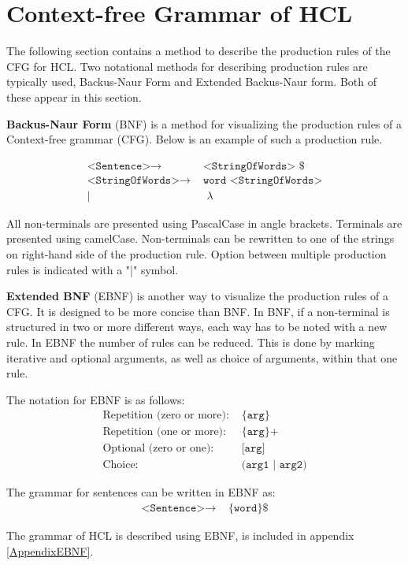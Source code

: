 \section{Context-free Grammar of HCL}
\label{CFGdescription}
The following section contains a method to describe the production rules of the CFG for HCL.
Two notational methods for describing production rules are typically used, Backus-Naur Form and Extended Backus-Naur form. 
Both of these appear in this section.

\textbf{Backus-Naur Form} (BNF) is a method for visualizing the production rules of a Context-free grammar (CFG).
Below is an example of such a production rule.

\begin{align*}
	\texttt{<Sentence>}\to & \texttt{ <StringOfWords> \$}\\
	\texttt{<StringOfWords>}\to & \texttt{ word <StringOfWords>}\\
	| & \texttt{ }\lambda
\end{align*}

All non-terminals are presented using PascalCase in angle brackets.
Terminals are presented using camelCase.
Non-terminals can be rewritten to one of the strings on right-hand side of the production rule.
Option between multiple production rules is indicated with a "|" symbol.

\textbf{Extended BNF} (EBNF) is another way to visualize the production rules of a CFG.
It is designed to be more concise than BNF.
In BNF, if a non-terminal is structured in two or more different ways, each way has to be noted with a new rule.
In EBNF the number of rules can be reduced.
This is done by marking iterative and optional arguments, as well as choice of arguments, within that one rule.
\cite{SebestaEBNF}

The notation for EBNF is as follows:
\begin{align*}
	\text{Repetition (zero or more):} & \texttt{ \{arg\}}\\
	\text{Repetition (one or more):} & \texttt{ \{arg\}+}\\
	\text{Optional (zero or one):} & \texttt{ [arg]}\\
	\text{Choice:} & \texttt{ (arg1 | arg2)}
\end{align*}

The grammar for sentences can be written in EBNF as:
\begin{align*}
	\texttt{<Sentence>}\to & \texttt{ \{word\} \$}
\end{align*}

The grammar of HCL is described using EBNF, is included in appendix \ref{AppendixEBNF}.
